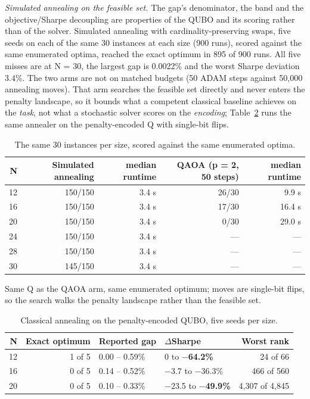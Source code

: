 \documentclass[journal]{IEEEtran}
\begin{document}
\textit{Simulated annealing on the feasible set.} The gap's denominator, the band and the objective/Sharpe decoupling are properties of the QUBO and its scoring rather than of the solver. Simulated annealing with cardinality-preserving swaps, five seeds on each of the same 30 instances at each size (900 runs), scored against the same enumerated optima, reached the exact optimum in 895 of 900 runs. All five misses are at N = 30, the largest gap is 0.0022\% and the worst Sharpe deviation 3.4\%. The two arms are not on matched budgets (50 ADAM steps against 50,000 annealing moves). That arm searches the feasible set directly and never enters the penalty landscape, so it bounds what a competent classical baseline achieves on the \textit{task}, not what a stochastic solver scores on the \textit{encoding}; Table~\ref{tab:S11} runs the same annealer on the penalty-encoded Q with single-bit flips.





\begin{table}[!t]
\centering
\scriptsize
\caption{The same 30 instances per size, scored against the same enumerated optima.}
\label{tab:S10}
\begin{tabular}{rrrrr}
\toprule
N & Simulated annealing & median runtime & QAOA (p = 2, 50 steps) & median runtime \\
\midrule
12 & 150/150 & 3.4 s & 26/30 & 9.9 s \\
16 & 150/150 & 3.4 s & 17/30 & 16.4 s \\
20 & 150/150 & 3.4 s & 0/30 & 29.0 s \\
24 & 150/150 & 3.4 s & --- & --- \\
28 & 150/150 & 3.4 s & --- & --- \\
30 & 145/150 & 3.4 s & --- & --- \\
\bottomrule
\end{tabular}
\end{table}


Same Q as the QAOA arm, same enumerated optimum; moves are single-bit flips, so the search walks the penalty landscape rather than the feasible set.


\begin{table}[!t]
\centering
\scriptsize
\caption{Classical annealing on the penalty-encoded QUBO, five seeds per size.}
\label{tab:S11}
\begin{tabular}{rrllr}
\toprule
N & Exact optimum & Reported gap & $\Delta$Sharpe & Worst rank \\
\midrule
12 & 1 of 5 & 0.00 -- 0.59\% & 0 to \textbf{$-$64.2\%} & 24 of 66 \\
16 & 0 of 5 & 0.14 -- 0.52\% & $-$3.7 to $-$36.3\% & 466 of 560 \\
20 & 0 of 5 & 0.10 -- 0.33\% & $-$23.5 to \textbf{$-$49.9\%} & 4,307 of 4,845 \\
\bottomrule
\end{tabular}
\end{table}
\end{document}
